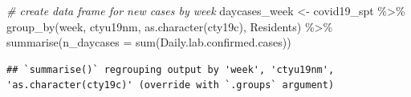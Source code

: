\documentclass[
]{book}
\newenvironment{Shaded}{\begin{snugshade}}{\end{snugshade}}
\newcommand{\AttributeTok}[1]{\textcolor[rgb]{0.77,0.63,0.00}{#1}}
\newcommand{\CommentTok}[1]{\textcolor[rgb]{0.56,0.35,0.01}{\textit{#1}}}
\newcommand{\FunctionTok}[1]{\textcolor[rgb]{0.00,0.00,0.00}{#1}}
\newcommand{\NormalTok}[1]{#1}
\newcommand{\OtherTok}[1]{\textcolor[rgb]{0.56,0.35,0.01}{#1}}
\newcommand{\SpecialCharTok}[1]{\textcolor[rgb]{0.00,0.00,0.00}{#1}}
\begin{document}
\begin{Shaded}
\begin{Highlighting}[]
\CommentTok{\# create data frame for new cases by week}
\NormalTok{daycases\_week }\OtherTok{\textless{}{-}}\NormalTok{ covid19\_spt }\SpecialCharTok{\%\textgreater{}\%} \FunctionTok{group\_by}\NormalTok{(week, ctyu19nm, }\FunctionTok{as.character}\NormalTok{(cty19c), Residents) }\SpecialCharTok{\%\textgreater{}\%}
  \FunctionTok{summarise}\NormalTok{(}\AttributeTok{n\_daycases =} \FunctionTok{sum}\NormalTok{(Daily.lab.confirmed.cases)) }
\end{Highlighting}
\end{Shaded}

\begin{verbatim}
## `summarise()` regrouping output by 'week', 'ctyu19nm', 'as.character(cty19c)' (override with `.groups` argument)
\end{verbatim}
\end{document}

